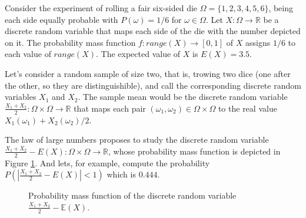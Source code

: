 \begin{example}
Consider the experiment of rolling a fair six-sided die $\Omega = \{1, 2, 3, 4, 5, 6\}$, being each side equally probable with $P(\omega)=1/6$ for $\omega \in \Omega$. Let $X:\Omega \rightarrow \mathbb{R}$ be a discrete random variable that maps each side of the die with the number depicted on it. The probability mass function $f: range(X) \rightarrow [0, 1]$ of $X$ assigns $1/6$ to each value of $range(X)$. The expected value of $X$ is $E(X) = 3.5$.

Let's consider a random sample of size two, that is, trowing two dice (one after the other, so they are distinguishible), and call the corresponding discrete random variables $X_1$ and $X_2$. The sample mean would be the discrete random variable $\frac{X_1 + X_2}{2}: \Omega \times \Omega \rightarrow \mathbb{R}$ that maps each pair $(\omega_1, \omega_2) \in \Omega \times \Omega$ to the real value $X_1(\omega_1) + X_2(\omega_2) / 2$. 

The law of large numbers proposes to study the discrete random variable $\frac{X_1 + X_2}{2} - E(X): \Omega \times \Omega \rightarrow \mathbb{R}$, whose probability mass function is depicted in Figure \ref{fig:law_large_numbers_1}. And lets, for example, compute the probability $P(  |\frac{X_1 + X_2}{2} - E(X)| < 1 )$ which is $0.444$.

\begin{figure}[t]
\centering
{}
\caption{\label{fig:law_large_numbers_1}Probability mass function of the discrete random variable $\frac{X_1 + X_2 }{2} - \mathbb{E}(X)$.}
\end{figure}


\end{example}
